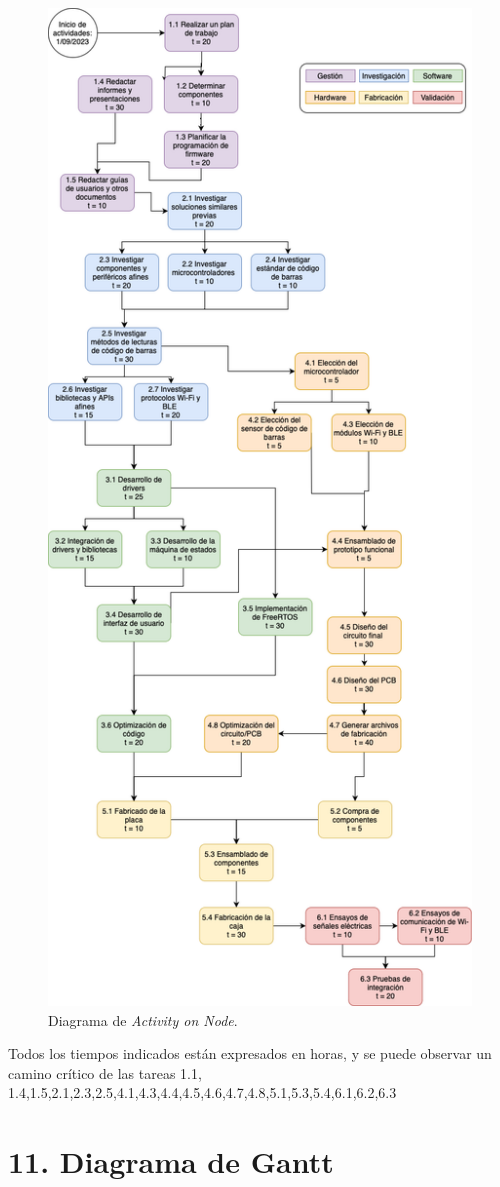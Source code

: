 \documentclass[
11pt, %
codirector, %
]{charter}
\begin{document}
\begin{figure}[htpb]
\centering 
\includegraphics[width=.6\textwidth]{./Figuras/diagramaAoN.png}
\caption{Diagrama de \textit{Activity on Node}.}
\label{fig:AoN}
\end{figure}

Todos los tiempos indicados están expresados en horas, y se puede observar un camino crítico de las tareas 1.1, 1.4,1.5,2.1,2.3,2.5,4.1,4.3,4.4,4.5,4.6,4.7,4.8,5.1,5.3,5.4,6.1,6.2,6.3



\section{11. Diagrama de Gantt}
\label{sec:gantt}
\end{document}
